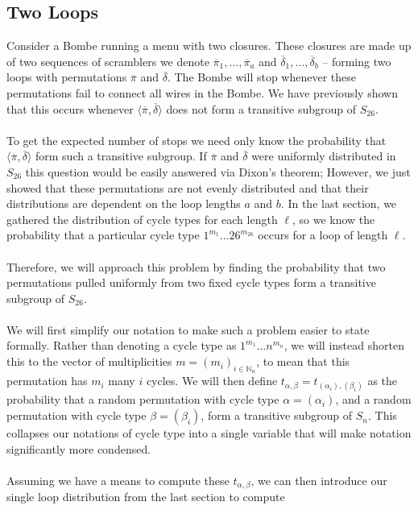 \subsection{Two Loops}
Consider a Bombe running a menu with two closures. These closures are
made up of two sequences of scramblers we denote $\overline\pi_1,
\dots, \overline\pi_a$ and
$\overline\delta_1,\dots,\overline\delta_b$ -- forming two loops with
permutations $\overline\pi$ and $\overline\delta$. The Bombe will
stop whenever these permutations fail to connect all wires in the
Bombe. We have previously shown that this occurs whenever $\langle
\overline\pi, \overline\delta \rangle$ does not form a transitive
subgroup of $S_{26}$.
\\\\To get the expected number of stops we need only know the
probability that $\langle \overline\pi, \overline\delta \rangle$ form
such a transitive subgroup. If $\overline\pi$ and $\overline\delta$
were uniformly distributed in $S_{26}$ this question would be easily
answered via Dixon's theorem; However, we just showed that these
permutations are not evenly distributed and that their distributions are
dependent on the loop lengths $a$ and $b$. In the last section, we
gathered the distribution of cycle types for each length $\ell$, so we know the
probability that a particular cycle type $1^{m_1}\dots26^{m_{26}}$
occurs for a loop of length $\ell$.
\\\\Therefore, we will approach this problem by finding the
probability that two permutations pulled uniformly from two fixed
cycle types form a transitive subgroup of $S_{26}$.
\\\\We will first simplify our notation to make such a problem easier
to state formally. Rather than denoting a cycle type as $1^{m_1}\dots
n^{m_{n}}$, we will instead shorten this to the vector of
multiplicities $m=(m_i)_{i\in\mathbb{N}_n}$, to mean
that this permutation has $m_i$ many $i$ cycles. We will then define
$t_{\alpha, \beta} =t_{(\alpha_i), (\beta_i)}$ as the probability
that a random permutation with cycle type $\alpha =(\alpha_i)$, and a
random permutation with cycle type $\beta = (\beta_i)$, form a
transitive subgroup of $S_n$. This collapses our notations of cycle
type into a single variable that will make notation significantly
more condensed.
\\\\Assuming we have a means to compute these $t_{\alpha, \beta}$, we
can then introduce our single loop distribution from the last section to compute
